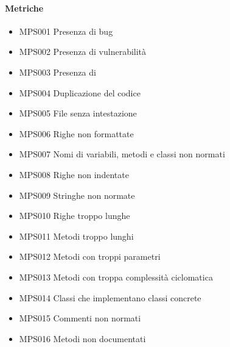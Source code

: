 		\paragraph*{Metriche} 
		\begin{itemize}
			\item MPS001 Presenza di bug
			\item MPS002 Presenza di vulnerabilità
			\item MPS003 Presenza di 
			\item MPS004 Duplicazione del codice
            \item MPS005 File senza intestazione
            \item MPS006 Righe non formattate
            \item MPS007 Nomi di variabili, metodi e classi non normati
            \item MPS008 Righe non indentate
            \item MPS009 Stringhe non normate
            \item MPS010 Righe troppo lunghe
            \item MPS011 Metodi troppo lunghi
            \item MPS012 Metodi con troppi parametri
            \item MPS013 Metodi con troppa complessità ciclomatica
            \item MPS014 Classi che implementano classi concrete
            \item MPS015 Commenti non normati
            \item MPS016 Metodi non documentati
		\end{itemize} 

